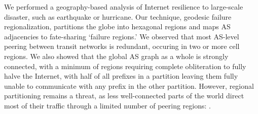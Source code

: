     We performed a geography-based analysis of Internet resilience to large-scale disaster, such as earthquake or hurricane.
    Our technique, geodesic failure regionalization, partitions the globe into hexagonal regions and maps AS adjacencies to fate-sharing `failure regions.'
    We observed that most AS-level peering between transit networks is redundant, occuring in two or more cell regions.
    We also showed that the global AS graph as a whole is strongly connected, with a minimum of  regions requiring complete obliteration to fully halve the Internet, with half of all prefixes in a partition leaving them fully unable to communicate with any prefix in the other partition.
    However, regional partitioning remains a threat, as less well-connected parts of the world direct most of their traffic through a limited number of peering regions: .
